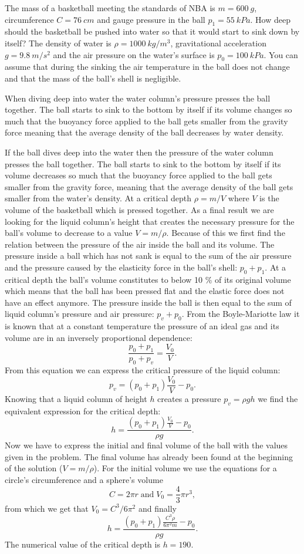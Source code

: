 The mass of a basketball meeting the standards of NBA is $m=\SI{600}{g}$, circumference $C=\SI{76}{cm}$ and gauge pressure in the ball $p_1=\SI{55}{kPa}$. How deep should the basketball be pushed into water so that it would start to sink down by itself? The density of water is $\rho=\SI{1000}{kg/m^3}$, gravitational acceleration $g=\SI{9,8}{m/s^2}$ and the air pressure on the water's surface is $p_0=\SI{100}{kPa}$. You can assume that during the sinking the air temperature in the ball does not change and that the mass of the ball’s shell is negligible.

\hinteng
When diving deep into water the water column's pressure presses the ball together. The ball starts to sink to the bottom by itself if its volume changes so much that the buoyancy force applied to the ball gets smaller from the gravity force meaning that the average density of the ball decreases by water density.

\solueng
If the ball dives deep into the water then the pressure of the water column presses the ball together. The ball starts to sink to the bottom by itself if its volume decreases so much that the buoyancy force applied to the ball gets smaller from the gravity force, meaning that the average density of the ball gets smaller from the water’s density. At a critical depth $\rho=m/V$ where $V$ is the volume of the basketball which is pressed together. As a final result we are looking for the liquid column’s height that creates the necessary pressure for the ball’s volume to decrease to a value $V=m/\rho$. Because of this we first find the relation between the pressure of the air inside the ball and its volume. The pressure inside a ball which has not sank is equal to the sum of the air pressure and the pressure caused by the elasticity force in the ball’s shell: $p_0+p_1$. At a critical depth the ball’s volume constitutes to below 10 \% of its original volume which means that the ball has been pressed flat and the elastic force does not have an effect anymore. The pressure inside the ball is then equal to the sum of liquid column’s pressure and air pressure: $p_v+p_0$. From the Boyle-Mariotte law it is known that at a constant temperature the pressure of an ideal gas and its volume are in an inversely proportional dependence:
\[
\frac{p_0+p_1}{p_0+p_v}=\frac{V_0}{V}.
\]
From this equation we can express the critical pressure of the liquid column:
\[
p_v = (p_0+p_1) \frac{V_0}{V} - p_0.
\] 
Knowing that a liquid column of height $h$ creates a pressure $p_v=\rho g h$ we find the equivalent expression for the critical depth:
\[
h = \frac{(p_0+p_1) \frac{V_0}{V} - p_0}{\rho g}.
\] 
Now we have to express the initial and final volume of the ball with the values given in the problem. The final volume has already been found at the beginning of the solution ($V=m/\rho$). For the initial volume we use the equations for a circle’s circumference and a sphere’s volume
\[
C = 2\pi r \; \text{and} \; V_0 = \frac{4}{3}\pi r^3,
\] 
from which we get that $V_0=C^3/6\pi^2$ and finally
\[
h = \frac{(p_0+p_1) \frac{C^3 \rho}{6\pi^2 m} - p_0}{\rho g}.
\] 
The numerical value of the critical depth is $h=190$.
\probend